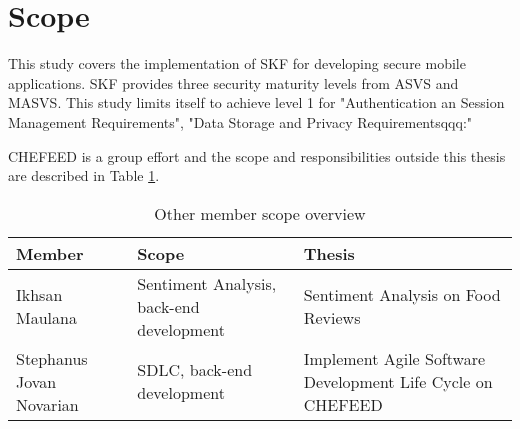 \section{Scope}
This study covers the implementation of SKF for developing secure mobile applications. SKF provides three security maturity levels from ASVS and MASVS. This study limits itself to achieve level 1 for "Authentication an Session Management Requirements", "Data Storage and Privacy Requirementsqqq:" 


CHEFEED is a group effort and the scope and responsibilities outside this thesis are described in Table \ref{tab:member-scope}.

\begin{table}[!h]
    \centering
    \caption{Other member scope overview}
    \label{tab:member-scope}
    \begin{tabular}{|l|p{10em}|p{12em}|}
        \hline
        \textbf{Member} & \textbf{Scope} & \textbf{Thesis} \\
        \hline
        Ikhsan Maulana & Sentiment Analysis, back-end development & Sentiment Analysis on Food Reviews \\
        \hline
        Stephanus Jovan Novarian & SDLC, back-end development & Implement Agile Software Development Life Cycle on CHEFEED \\
        \hline
    \end{tabular}
\end{table}
